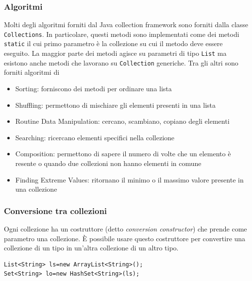 \documentclass{article}
\begin{document}
\subsubsection{Algoritmi}
Molti degli algoritmi forniti dal Java collection framework sono forniti dalla classe \texttt{Collections}. In particolare, questi metodi sono implementati come dei metodi \texttt{static} il cui primo parametro \`e la collezione su cui il metodo deve essere eseguito. La maggior parte dei metodi agisce su parametri di tipo \texttt{List} ma esistono anche metodi che lavorano su \texttt{Collection} generiche.
Tra gli altri sono forniti algoritmi di 
\begin{itemize}
\item Sorting: forniscono dei metodi per ordinare una lista
\item Shuffling: permettono di mischiare gli elementi presenti in una lista
\item Routine Data Manipulation: cercano, scambiano, copiano degli elementi
\item Searching: ricercano elementi specifici nella collezione
\item Composition: permettono di sapere il numero di volte che un elemento \`e resente o quando due collezioni non hanno elementi in comune
\item Finding Extreme Values: ritornano il minimo o il massimo valore presente in una collezione
\end{itemize}









\subsubsection{Conversione tra collezioni}
Ogni collezione ha un costruttore (detto \emph{conversion constructor}) che prende come parametro una collezione. \`E possibile usare questo costruttore per convertire una collezione di un tipo in un'altra collezione di un altro tipo.
\begin{lstlisting}
List<String> ls=new ArrayList<String>();
Set<String> lo=new HashSet<String>(ls);
\end{lstlisting}
\end{document}
